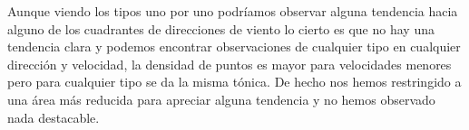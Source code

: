 Aunque viendo los tipos uno por uno podríamos observar alguna tendencia hacia alguno de los cuadrantes de direcciones de viento lo cierto es que no hay una tendencia clara y podemos encontrar observaciones de cualquier tipo en cualquier dirección y velocidad, la densidad de puntos es mayor para velocidades menores pero para cualquier tipo se da la misma tónica. De hecho nos hemos restringido a una área más reducida para apreciar alguna tendencia y no hemos observado nada destacable.